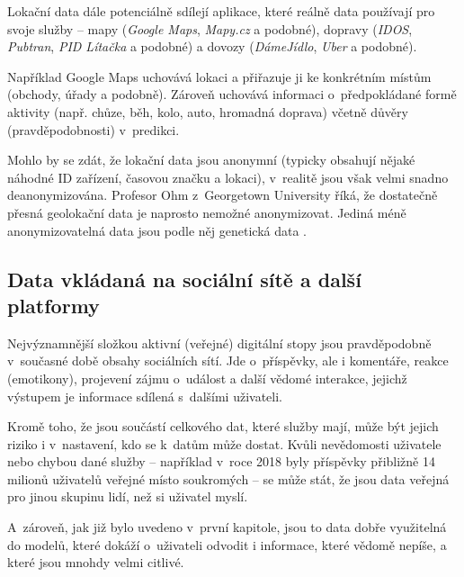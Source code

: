 Lokační data dále potenciálně sdílejí aplikace, které reálně data používají pro svoje služby -- mapy (\textit{Google Maps}, \textit{Mapy.cz} a podobné), dopravy (\textit{IDOS}, \textit{Pubtran}, \textit{PID Lítačka} a podobné) a dovozy (\textit{DámeJídlo}, \textit{Uber}  a podobné).

Například Google Maps uchovává lokaci a přiřazuje ji ke konkrétním místům (obchody, úřady a podobně). Zároveň uchovává informaci o~předpokládané formě aktivity (např. chůze, běh, kolo, auto, hromadná doprava) včetně důvěry (pravděpodobnosti) v~predikci.

Mohlo by se zdát, že lokační data jsou anonymní (typicky obsahují nějaké náhodné ID zařízení, časovou značku a lokaci), v~realitě jsou však velmi snadno deanonymizována. Profesor Ohm z~Georgetown University říká, že dostatečně přesná geolokační data je naprosto nemožné anonymizovat. Jediná méně anonymizovatelná data jsou podle něj genetická data \citep{location-data}.

\subsection{Data vkládaná na sociální sítě a další platformy}
Nejvýznamnější složkou aktivní (veřejné) digitální stopy jsou pravděpodobně v~současné době obsahy sociálních sítí.
Jde o~příspěvky, ale i komentáře, reakce (emotikony), projevení zájmu o~událost a další vědomé interakce, jejichž výstupem je informace sdílená s~dalšími uživateli. 

Kromě toho, že jsou součástí celkového  dat, které služby mají, může být jejich riziko i v~nastavení, kdo se k~datům může dostat.
Kvůli nevědomosti uživatele nebo chybou dané služby -- například v~roce 2018 byly příspěvky přibližně 14 milionů uživatelů veřejné místo soukromých \citep{facebook-public-posts} -- se může stát, že jsou data veřejná pro jinou skupinu lidí, než si uživatel myslí. 

A~zároveň, jak již bylo uvedeno v~první kapitole, jsou to data dobře využitelná do modelů, které dokáží o~uživateli odvodit i informace, které vědomě nepíše, a které jsou mnohdy velmi citlivé.

